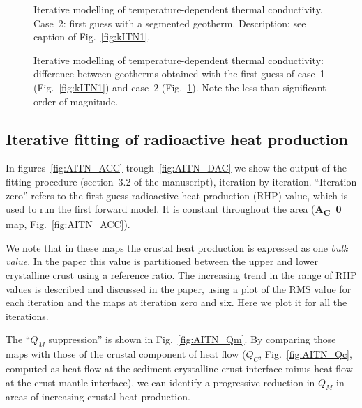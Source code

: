 {\begin{subappendices}
\begin{figure}
	\begin{adjustbox}{center}
	\end{adjustbox}
	\caption{Iterative modelling of temperature-dependent thermal conductivity. Case~2: first guess with a segmented geotherm.
	Description: see caption of Fig.~\ref{fig:kITN1}.}
	\label{fig:kITN2}
\end{figure}

\begin{figure}
	\begin{adjustbox}{center}
	\end{adjustbox}
	\caption{Iterative modelling of temperature-dependent thermal conductivity: difference between geotherms obtained with the first guess of case~1 (Fig.~\ref{fig:kITN1}) and case~2 (Fig.~\ref{fig:kITN2}).
	Note the less than significant order of magnitude.}
	\label{fig:kITNdiff}
\end{figure}

\FloatBarrier

\subsection{Iterative fitting of radioactive heat production}
\label{ss:ApplSup:MethodTests:ItFit}
In figures~\ref{fig:AITN_ACC} trough~\ref{fig:AITN_DAC} we show the output of the fitting procedure (section~3.2 of the manuscript), iteration by iteration.
``Iteration zero'' refers to the first-guess radioactive heat production (RHP) value, which is used to run the first forward model.
It is constant throughout the area (\textbf{A\textsubscript{C}~0} map, Fig.~\ref{fig:AITN_ACC}).

We note that in these maps the crustal heat production is expressed as one \textit{bulk value}.
In the paper this value is partitioned between the upper and lower crystalline crust using a reference ratio.
The increasing trend in the range of RHP values is described and discussed in the paper, using a plot of the RMS value for each iteration and the maps at iteration zero and six.
Here we plot it for all the iterations.

The ``$Q_M$ suppression'' is shown in Fig.~\ref{fig:AITN_Qm}.
By comparing those maps with those of the crustal component of heat flow ($Q_C$, Fig.~\ref{fig:AITN_Qc}, computed as heat flow at the sediment-crystalline crust interface minus heat flow at the crust-mantle interface), we can identify a progressive reduction in $Q_M$ in areas of increasing crustal heat production.


\end{subappendices}}
